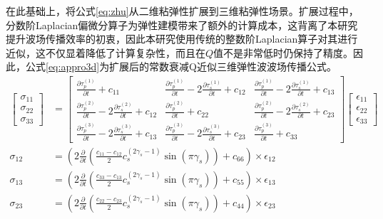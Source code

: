 \documentclass[degree=doctor]{thuthesis}
\begin{document}
在此基础上，将公式\ref{eq:zhu}从二维粘弹性扩展到三维粘弹性场景。扩展过程中，分数阶Laplacian偏微分算子为弹性建模带来了额外的计算成本，这背离了本研究提升波场传播效率的初衷，因此本研究使用传统的整数阶Laplacian算子对其进行近似，这不仅显着降低了计算复杂性，而且在$Q$值不是非常低时仍保持了精度\cite{shen2015image}。因此，公式\ref{eq:appro3d}为扩展后的常数衰减Q近似三维弹性波波场传播公式。
\begin{equation}
\begin{aligned}
\begin{bmatrix} \sigma_{11}\\ \sigma_{22}\\ \sigma_{33} \end{bmatrix} &= \begin{bmatrix} \frac{\partial \tau_p^{(1)}}{\partial t} + c_{11} & \frac{\partial \tau_p^{(1)}}{\partial t} - 2\frac{\partial \tau_s^{(1)}}{\partial t} +c_{12}& \frac{\partial \tau_p^{(1)}}{\partial t} - 2\frac{\partial \tau_s^{(1)}}{\partial t} +c_{13} \\ \frac{\partial \tau_p^{(2)}}{\partial t} - 2\frac{\partial \tau_s^{(2)}}{\partial t} +c_{12}& \frac{\partial \tau_p^{(2)}}{\partial t} + c_{22} & \frac{\partial \tau_p^{(2)}}{\partial t} - 2\frac{\partial \tau_s^{(2)}}{\partial t} +c_{23}\\ \frac{\partial \tau_p^{(3)}}{\partial t} - 2\frac{\partial \tau_s^{(3)}}{\partial t} +c_{13} & \frac{\partial \tau_p^{(3)}}{\partial t} - 2\frac{\partial \tau_s^{(3)}}{\partial t} +c_{23} & \frac{\partial \tau_p^{(3)}}{\partial t} + c_{33} \end{bmatrix} \begin{bmatrix} \epsilon_{11}\\ \epsilon_{22}\\ \epsilon_{33} \end{bmatrix} \\
\sigma_{12} &= \left ( 2\frac{\partial}{\partial t} \left( \frac{c_{11}-c_{12}}{2}c_s^{(2\gamma_s-1)}\sin(\pi\gamma_s) \right) + c_{66} \right )\times \epsilon_{12}\\
\sigma_{13} &= \left ( 2\frac{\partial}{\partial t} \left( \frac{c_{33}-c_{13}}{2}c_s^{(2\gamma_s-1)}\sin(\pi\gamma_s) \right) + c_{55} \right )\times \epsilon_{13} \\
\sigma_{23} &= \left ( 2\frac{\partial}{\partial t} \left( \frac{c_{22}-c_{23}}{2}c_s^{(2\gamma_s-1)}\sin(\pi\gamma_s) \right) + c_{44} \right )\times \epsilon_{23}
\end{aligned}
\label{eq:appro3d}
\end{equation}
\end{document}
